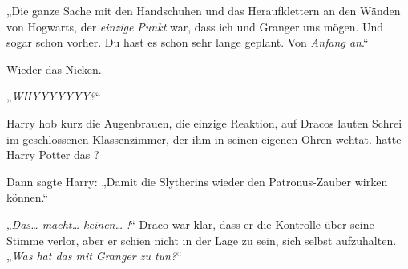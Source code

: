 „Die ganze Sache mit den Handschuhen und das Heraufklettern an den Wänden von Hogwarts, der \emph{einzige Punkt} war, dass ich und Granger uns mögen. Und sogar schon vorher. Du hast es schon sehr lange geplant. Von \emph{Anfang an}.“

Wieder das Nicken.

„\emph{WHYYYYYYY?}“

Harry hob kurz die Augenbrauen, die einzige Reaktion, auf Dracos lauten Schrei im geschlossenen Klassenzimmer, der ihm in seinen eigenen Ohren wehtat.  hatte Harry Potter das ?

Dann sagte Harry: „Damit die Slytherins wieder den Patronus-Zauber wirken können.“

„\emph{Das… macht… keinen… !}“ Draco war klar, dass er die Kontrolle über seine Stimme verlor, aber er schien nicht in der Lage zu sein, sich selbst aufzuhalten. „\emph{Was hat das mit Granger zu tun?}“

